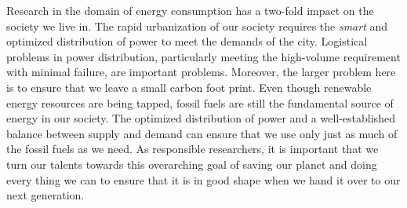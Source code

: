 Research in the domain of energy consumption has a two-fold impact on the society we live in. The rapid urbanization of our society requires the \emph{smart} and optimized distribution of power to meet the demands of the city. Logistical problems in power distribution, particularly meeting the high-volume requirement with minimal failure, are important problems. Moreover, the larger problem here is to ensure that we leave a small carbon foot print. Even though renewable energy resources are being tapped, fossil fuels are still the fundamental source of energy in our society. The optimized distribution of power and a well-established balance between supply and demand can ensure that we use only just as much of the fossil fuels as we need. As responsible researchers, it is important that we turn our talents towards this overarching goal of saving our planet and doing every thing we can to ensure that it is in good shape when we hand it over to our next generation.
